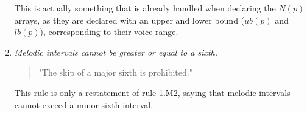 \begin{enumerate}[wide, label=\bfseries 1.M\arabic*]
    This is actually something that is already handled when declaring the $N(p)$ arrays, as they are declared with an upper and lower bound ($ub(p)$ and $lb(p)$), corresponding to their voice range.

    \item\label{rule:melodic-intervals-cannot-be-greater-or-equal-to-a-sixth} \reddot \textit{Melodic intervals cannot be greater or equal to a sixth.}

    \begin{quotation}
    "The skip of a major sixth is prohibited."
    \textcite[p.79]{GaPEng}
    \end{quotation}

    This rule is only a restatement of rule 1.M2, saying that melodic intervals cannot exceed a minor sixth interval.
\end{enumerate}

